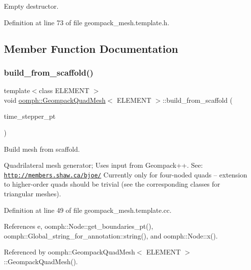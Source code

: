 Empty destructor. 



Definition at line 73 of file geompack\+\_\+mesh.\+template.\+h.



\subsection{Member Function Documentation}
\mbox{\label{classoomph_1_1GeompackQuadMesh_a714ee07999e06676f08080bac8c024db}} 
\subsubsection{\texorpdfstring{build\+\_\+from\+\_\+scaffold()}{build\_from\_scaffold()}}
{\footnotesize\ttfamily template$<$class E\+L\+E\+M\+E\+NT $>$ \\
void \hyperlink{classoomph_1_1GeompackQuadMesh}{oomph\+::\+Geompack\+Quad\+Mesh}$<$ E\+L\+E\+M\+E\+NT $>$\+::build\+\_\+from\+\_\+scaffold (\begin{DoxyParamCaption}\item[{\hyperlink{classoomph_1_1TimeStepper}{Time\+Stepper} $\ast$}]{time\+\_\+stepper\+\_\+pt }\end{DoxyParamCaption})\hspace{0.3cm}{\ttfamily [private]}}



Build mesh from scaffold. 

Quadrilateral mesh generator; Uses input from Geompack++. See\+: \href{http://members.shaw.ca/bjoe/}{\tt http\+://members.\+shaw.\+ca/bjoe/} Currently only for four-\/noded quads -- extension to higher-\/order quads should be trivial (see the corresponding classes for triangular meshes). 

Definition at line 49 of file geompack\+\_\+mesh.\+template.\+cc.



References e, oomph\+::\+Node\+::get\+\_\+boundaries\+\_\+pt(), oomph\+::\+Global\+\_\+string\+\_\+for\+\_\+annotation\+::string(), and oomph\+::\+Node\+::x().



Referenced by oomph\+::\+Geompack\+Quad\+Mesh$<$ E\+L\+E\+M\+E\+N\+T $>$\+::\+Geompack\+Quad\+Mesh().



